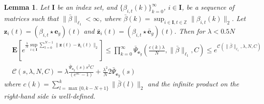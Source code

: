 \documentclass[10pt,a4paper]{amsart}
\newtheorem{lemma}{Lemma}
\newcommand{\bE}{\mathbf{E}}
\newcommand{\e}{\mathbf{e}}
\def\rve{{\mathbf{e}}}
\def\rvz{{\mathbf{z}}}
\begin{document}
\begin{lemma}
\label{basic_lemma:lipschitz}
Let $\mathbf{I}$ be an index set, and $\{\beta_{i,t}(k)\}_{k=0}^{\infty}$, $i \in \mathbf{I}$, be a sequence of matrices such that $\|\bar{\beta}\|_{\ell_1}< \infty$, where $\bar{\beta}(k)=\sup_{i \in \mathbf{I},t \in \mathbb{Z}} \|\beta_{i,t}(k)\|_2$. Let $\rvz_{i}(t)=(\beta_{i,t} \star \e_g)(t)$ and
$\bar{\rvz}_i(t)=(\beta_{i,t} \star \bar{\e}_g)(t)$.
Then for $\lambda < 0.5N$
 \begin{align*}
 & \bE[e^{\frac{\lambda}{N} \sup_{i \in \mathbf{I}}\sum_{t=0}^{N-1} \|\rvz(t)-\bar{\rvz}_i(t)\|_2}]
  \le \prod_{k=0}^{\infty} 
  \bar{\Psi}_{\rve_g}\left(\frac{c(k) \lambda}{N},\|\bar{\beta}\|_{\ell_1},C\right) \le 
   e^{\mathcal{C}(\|\bar{\beta}\|_{\ell_1},\lambda,N,C)}  \\
   & \mathcal{C}(s,\lambda,N,C)=\lambda \frac{\bar{\Psi}_{\rve_g}(s)s^2C}{(e^{sC}-1)}+
     \frac{\lambda^2}{N} 2\bar{\Psi}_{\rve_g}( s)
 \end{align*} 
 where 
 $c(k)=\sum_{l=\max\{0,k-N+1\}}^{k} \|\bar{\beta}(l)\|_2$
 and the infinite product on the right-hand side is well-defined. 
\end{lemma}
\end{document}
